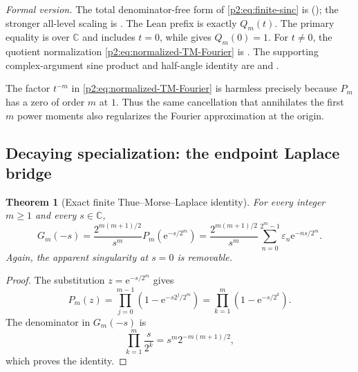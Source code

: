 \documentclass[11pt,oneside]{article}
\numberwithin{equation}{section}
\newtheorem{theorem}{Theorem}[section]
\theoremstyle{definition}
\theoremstyle{remark}
\newcommand{\C}{\mathbb C}
\newcommand{\e}{\mathrm e}
\newcommand{\eps}{\varepsilon}
\begin{document}
\emph{Formal version.}  The total denominator-free form of
\eqref{p2:eq:finite-sinc} is
(); the stronger all-level scaling is
.  The Lean prefix
 is exactly $Q_m(t)$.
The primary equality is over $\C$ and includes $t=0$, while
 gives $Q_m(0)=1$.
For $t\ne0$, the quotient normalization
\eqref{p2:eq:normalized-TM-Fourier} is
.
The supporting complex-argument sine product and half-angle identity are
 and
.

\begin{remark}
The factor $t^{-m}$ in \eqref{p2:eq:normalized-TM-Fourier} is harmless precisely because
$P_m$ has a zero of order $m$ at $1$.  Thus the same cancellation that annihilates the first
$m$ power moments also regularizes the Fourier approximation at the origin.
\end{remark}

\subsection{Decaying specialization: the endpoint Laplace bridge}

\begin{theorem}[Exact finite Thue--Morse--Laplace identity]
\label{p2:thm:finite-Laplace}
For every integer $m\ge1$ and every $s\in\C$,
\begin{equation}
 \boxed{
 G_m(-s)=\frac{2^{m(m+1)/2}}{s^m}
 P_m\!\left(\e^{-s/2^m}\right)
 =\frac{2^{m(m+1)/2}}{s^m}
  \sum_{n=0}^{2^m-1}\eps_n\e^{-ns/2^m}.}
 \label{p2:eq:finite-Laplace}
\end{equation}
Again, the apparent singularity at $s=0$ is removable.
\newresult
\end{theorem}

\begin{proof}
The substitution $z=\e^{-s/2^m}$ gives
\[
 P_m(z)=\prod_{j=0}^{m-1}\left(1-\e^{-s2^j/2^m}\right)
       =\prod_{k=1}^{m}\left(1-\e^{-s/2^k}\right).
\]
The denominator in $G_m(-s)$ is
\[
 \prod_{k=1}^{m}\frac{s}{2^k}
 =s^m2^{-m(m+1)/2},
\]
which proves the identity.
\end{proof}
\end{document}

